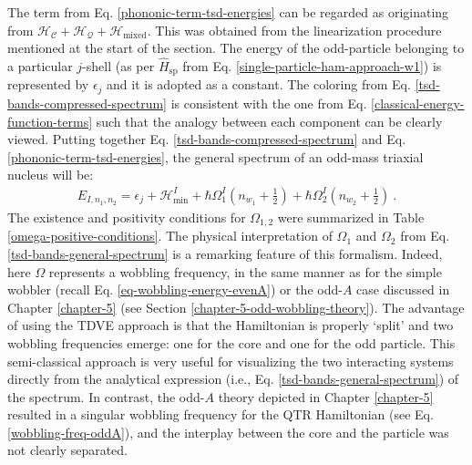 The term from Eq. \ref{phononic-term-tsd-energies} can be regarded as originating from $\mathcal{H}_\mathscr{C}+\mathcal{H}_\mathcal{Q}+\mathcal{H}_\text{mixed}$. This was obtained from the linearization procedure mentioned at the start of the section. The energy of the odd-particle belonging to a particular $j$-shell (as per $\hat{H}_\text{sp}$ from Eq. \ref{single-particle-ham-approach-w1}) is represented by $\epsilon_j$ and it is adopted as a constant. The coloring from Eq. \ref{tsd-bands-compressed-spectrum} is consistent with the one from Eq. \ref{classical-energy-function-terms} such that the analogy between each component can be clearly viewed. Putting together Eq. \ref{tsd-bands-compressed-spectrum} and Eq. \ref{phononic-term-tsd-energies}, the general spectrum of an odd-mass triaxial nucleus will be:
\begin{align}
    E_{I,n_1,n_2}=\epsilon_j+\mathcal{H}_\text{min}^I+\hbar\Omega_1^I\left(n_{w_1}+\frac{1}{2}\right)+\hbar\Omega_2^I\left(n_{w_2}+\frac{1}{2}\right)\ .
    \label{tsd-bands-general-spectrum}
\end{align}
The existence and positivity conditions for $\Omega_{1,2}$ were summarized in Table \ref{omega-positive-conditions}. The physical interpretation of $\Omega_1$ and $\Omega_2$ from Eq. \ref{tsd-bands-general-spectrum} is a remarking feature of this formalism. Indeed, here $\Omega$ represents a wobbling frequency, in the same manner as for the simple wobbler (recall Eq. \ref{eq-wobbling-energy-evenA}) or the odd-$A$ case discussed in Chapter \ref{chapter-5} (see Section \ref{chapter-5-odd-wobbling-theory}). The advantage of using the TDVE approach is that the Hamiltonian is properly `split' and two wobbling frequencies emerge: one for the core and one for the odd particle. This semi-classical approach is very useful for visualizing the two interacting systems directly from the analytical expression (i.e., Eq. \ref{tsd-bands-general-spectrum}) of the spectrum. In contrast, the odd-$A$ theory depicted in Chapter \ref{chapter-5} resulted in a singular wobbling frequency for the QTR Hamiltonian (see Eq. \ref{wobbling-freq-oddA}), and the interplay between the core and the particle was not clearly separated.

